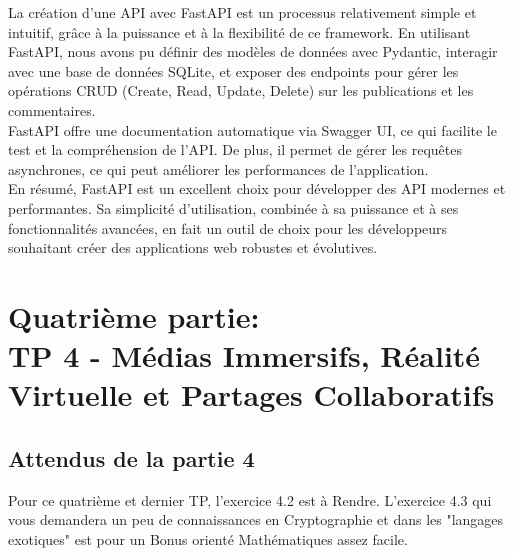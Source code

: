 \documentclass[a4paper,11pt]{article}
\begin{document}
        \begin{tcolorbox}[colback=lightgray!6, colframe=black, left=5mm, right=5mm, top=2mm, bottom=2mm, boxrule=0.1mm]
            La création d'une API avec FastAPI est un processus relativement simple et intuitif, grâce à la puissance et à la flexibilité de ce framework. 
            En utilisant FastAPI, nous avons pu définir des modèles de données avec Pydantic, interagir avec une base de données SQLite, et exposer des endpoints pour gérer les opérations CRUD (Create, Read, Update, Delete) sur les publications et les commentaires.\\

            FastAPI offre une documentation automatique via Swagger UI, ce qui facilite le test et la compréhension de l'API. De plus, il permet de gérer les requêtes asynchrones, ce qui peut améliorer les performances de l'application.\\

            En résumé, FastAPI est un excellent choix pour développer des API modernes et performantes. Sa simplicité d'utilisation, combinée à sa puissance et à ses fonctionnalités avancées, en fait un outil de choix pour les développeurs souhaitant créer des applications web robustes et évolutives.
        \end{tcolorbox}
    
    \newpage
    \section{Quatrième partie:\\ TP 4 - Médias Immersifs, Réalité Virtuelle et Partages Collaboratifs}
        \subsection{Attendus de la partie 4}
            \noindent Pour ce quatrième et dernier TP, l’exercice 4.2 est à Rendre. L’exercice 4.3 qui vous demandera un peu de connaissances en Cryptographie et dans les "langages exotiques" est pour un Bonus orienté Mathématiques assez facile.
        
        \newpage
\end{document}
